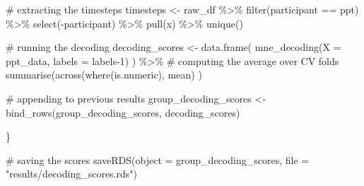 \documentclass[
  doc,
  floatsintext,
  longtable,
  a4paper,
  nolmodern,
  notxfonts,
  notimes,
  colorlinks=true,linkcolor=blue,citecolor=blue,urlcolor=blue]{apa7}
\newenvironment{Shaded}{\begin{snugshade}}{\end{snugshade}}
\newcommand{\AttributeTok}[1]{\textcolor[rgb]{0.40,0.45,0.13}{#1}}
\newcommand{\CommentTok}[1]{\textcolor[rgb]{0.37,0.37,0.37}{#1}}
\newcommand{\DecValTok}[1]{\textcolor[rgb]{0.68,0.00,0.00}{#1}}
\newcommand{\FunctionTok}[1]{\textcolor[rgb]{0.28,0.35,0.67}{#1}}
\newcommand{\NormalTok}[1]{\textcolor[rgb]{0.00,0.23,0.31}{#1}}
\newcommand{\OtherTok}[1]{\textcolor[rgb]{0.00,0.23,0.31}{#1}}
\newcommand{\SpecialCharTok}[1]{\textcolor[rgb]{0.37,0.37,0.37}{#1}}
\newcommand{\StringTok}[1]{\textcolor[rgb]{0.13,0.47,0.30}{#1}}
\begin{document}
\begin{Shaded}
\begin{Highlighting}[]
    \CommentTok{\# extracting the timesteps}
\NormalTok{    timesteps }\OtherTok{\textless{}{-}}\NormalTok{ raw\_df }\SpecialCharTok{\%\textgreater{}\%}
        \FunctionTok{filter}\NormalTok{(participant }\SpecialCharTok{==}\NormalTok{ ppt) }\SpecialCharTok{\%\textgreater{}\%}
        \FunctionTok{select}\NormalTok{(}\SpecialCharTok{{-}}\NormalTok{participant) }\SpecialCharTok{\%\textgreater{}\%}
        \FunctionTok{pull}\NormalTok{(x) }\SpecialCharTok{\%\textgreater{}\%}
        \FunctionTok{unique}\NormalTok{()}
    
    \CommentTok{\# running the decoding}
\NormalTok{    decoding\_scores }\OtherTok{\textless{}{-}} \FunctionTok{data.frame}\NormalTok{(}
        \FunctionTok{mne\_decoding}\NormalTok{(}\AttributeTok{X =}\NormalTok{ ppt\_data, }\AttributeTok{labels =}\NormalTok{ labels}\DecValTok{{-}1}\NormalTok{)}
\NormalTok{        ) }\SpecialCharTok{\%\textgreater{}\%}
        \CommentTok{\# computing the average over CV folds}
        \FunctionTok{summarise}\NormalTok{(}\FunctionTok{across}\NormalTok{(}\FunctionTok{where}\NormalTok{(is.numeric), mean) )}
    
    \CommentTok{\# appending to previous results}
\NormalTok{    group\_decoding\_scores }\OtherTok{\textless{}{-}} \FunctionTok{bind\_rows}\NormalTok{(group\_decoding\_scores, decoding\_scores)}
    
\NormalTok{\}}

\CommentTok{\# saving the scores}
\FunctionTok{saveRDS}\NormalTok{(}\AttributeTok{object =}\NormalTok{ group\_decoding\_scores, }\AttributeTok{file =} \StringTok{"results/decoding\_scores.rds"}\NormalTok{)}
\end{Highlighting}
\end{Shaded}
\end{document}
